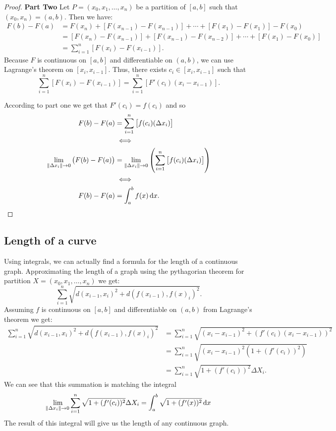 \documentclass[11pt,a4paper]{article}
\begin{document}
  \begin{proof}
  \textbf{Part Two}
  Let $P = (x_0, x_1, \ldots, x_n)$ be a partition of $[a,b]$ such 
  that $(x_0,x_n) = (a,b)$.
  Then we have:
  \begin{align*}
    F(b) - F(a) &= F(x_n) + \left[F(x_{n-1})-F(x_{n-1})\right] 
    + \cdots + \left[F(x_{1})-F(x_{1})\right] - F(x_0) \\
    &= \left[F(x_n)-F(x_{n-1})\right] + \left[F(x_{n-1})-F(x_{n-2})\right] 
    + \cdots + \left[F(x_1)-F(x_{0})\right] \\
    &= \sum_{i=1}^n{\left[F(x_{i})-F(x_{i-1})\right]}.
  \end{align*}
  Because $F$ is continuous on $[a,b]$ and differentiable on $(a,b)$, we can
  use Lagrange's theorem on $[x_i,x_{i-1}]$.
  Thus, there exists $c_i \in [x_i,x_{i-1}]$ such that
  \[
    \sum_{i=1}^n{\left[F(x_{i})-F(x_{i-1})\right]} 
    = \sum_{i=1}^n{\left[F'(c_i)(x_i-x_{i-1})\right]}.
  \]
  
  According to part one we get that $F'(c_i) = f(c_i)$ and so
  \begin{align*}
    F(b) - F(a) &= \sum_{i=1}^{n}{\left[f(c_i)(\Delta x_i)\right]} \\
    &\iff \\
    \lim_{\|\Delta x_i\|\to 0}{\left(F(b)-F(a)\right)} &= 
    \lim_{\|\Delta x_i\|\to 0}
    {\left(\sum_{i=1}^n{\left[f(c_i)(\Delta x_i)\right]}\right)} \\
    &\iff \\
    F(b)-F(a) &= \int_{a}^{b} f(x)\dx.
  \end{align*}
  \end{proof}
  
  \subsection{Length of a curve}
  Using integrals, we can actually find a formula for the length of a 
  continuous graph.
  Approximating the length of a graph using the pythagorian theorem for 
  partition $X = (x_0,x_1,\dots,x_n)$ we get:
  \[
    \sum_{i=1}^{n}{\sqrt{d(x_{i-1}, x_i)^2 + d(f(x_{i-1}), f(x)_i)^2}}.
  \]
  Assuming $f$ is continuous on $[a,b]$ and differentiable on $(a,b)$ 
  from Lagrange's theorem we get:
  \begin{align*}
    \sum_{i=1}^{n}{\sqrt{d(x_{i-1}, x_i)^2 + d(f(x_{i-1}), f(x)_i)^2}}
    &= \sum_{i=1}^{n}{\sqrt{(x_i - x_{i-1})^2 + (f'(c_i)(x_{i} - x_{i-1}))^2}}\\
    &= \sum_{i=1}^{n}{\sqrt{(x_i - x_{i-1})^2(1 + (f'(c_i))^2)}} \\
    &= \sum_{i=1}^{n}{\sqrt{1 + (f'(c_i))^2} \Delta X_i}.
  \end{align*}
  We can see that this summation is matching the integral
  \[
    \lim_{\norm{\Delta x_i} \to 0}{\sum_{i=1}^{n}
    {\sqrt{1 + (f'(c_i))^2}\Delta X_i}} = 
    \int_a^b{\sqrt{1 + (f'(x))^2}\dx}
  \]
  The result of this integral will give us the length of any continuous graph.
\end{document}
